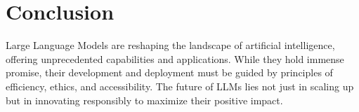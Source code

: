 \documentclass[12pt]{article}
\begin{document}
\section{Conclusion}
Large Language Models are reshaping the landscape of artificial intelligence, offering unprecedented capabilities and applications. While they hold immense promise, their development and deployment must be guided by principles of efficiency, ethics, and accessibility. The future of LLMs lies not just in scaling up but in innovating responsibly to maximize their positive impact.
\end{document}
